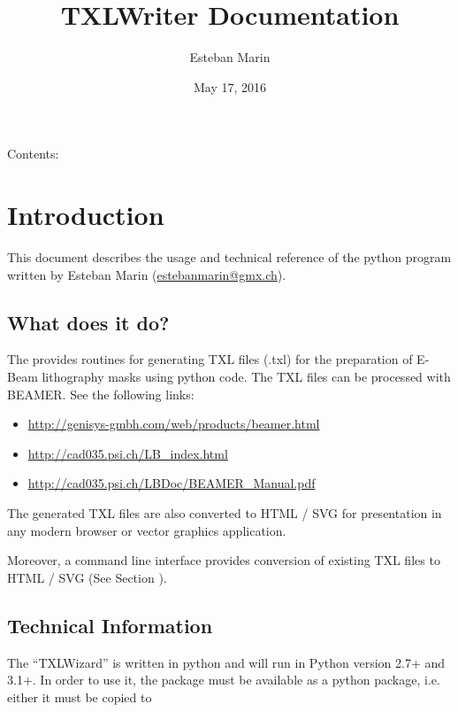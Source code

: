 \documentclass[letterpaper,10pt,english]{sphinxmanual}
\title{TXLWriter Documentation}
\date{May 17, 2016}
\author{Esteban Marin}
\begin{document}
\maketitle
\tableofcontents
{}\label{index::doc}


Contents:


\chapter{Introduction}
\label{Chapters/10_Introduction:introduction}\label{Chapters/10_Introduction::doc}\label{Chapters/10_Introduction:welcome-to-txlwriter-s-documentation}
This document describes the usage and technical reference of the python program 
written by Esteban Marin (\href{mailto:estebanmarin@gmx.ch}{estebanmarin@gmx.ch}).


\section{What does it do?}
\label{Chapters/10_Introduction:what-does-it-do}
The  provides routines for generating TXL files (.txl) for
the preparation of E-Beam lithography masks using python code. The TXL files can be processed with BEAMER.
See the following links:
\begin{itemize}
\item {} 
\url{http://genisys-gmbh.com/web/products/beamer.html}

\item {} 
\url{http://cad035.psi.ch/LB\_index.html}

\item {} 
\url{http://cad035.psi.ch/LBDoc/BEAMER\_Manual.pdf}

\end{itemize}

The generated TXL files are also converted to HTML / SVG for presentation in any modern browser or
vector graphics application.

Moreover, a command line interface  provides conversion of existing TXL files to HTML / SVG
(See Section {\hyperref[Chapters/30_TXLConverter:sec\string-txlconverter]{}}).


\section{Technical Information}
\label{Chapters/10_Introduction:technical-information}
The ``TXLWizard'' is written in python and will run in Python version 2.7+ and 3.1+.
In order to use it, the  package must be available as
a python package, i.e. either it must be copied to
\begin{quote}

\end{quote}
\end{document}
